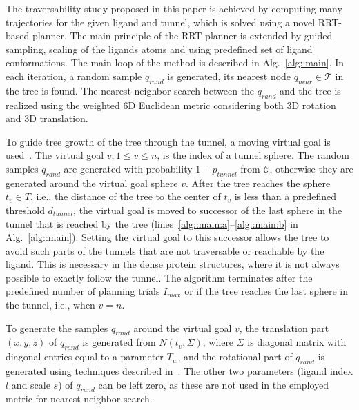 \documentclass{svmult}
\def\qrand{q_{rand}}
\def\qnear{q_{near}}
\def\T{\mathcal{T}}
\def\C{\mathcal{C}}
\def\dt{d_{tunnel}}
\def\rv{T_w}
\def\Imax{I_{max}} %
\def\gb{p_{tunnel}}
\begin{document}
The traversability study proposed in this paper is achieved by computing many trajectories for the given ligand and tunnel, which
is solved using a novel RRT-based planner.
The main principle of the RRT planner is extended by guided sampling, scaling of the ligands atoms and using predefined set of ligand
conformations.
The main loop of the method is described in Alg.~\ref{alg::main}.
In each iteration, a random sample $\qrand$ is generated, its nearest node $\qnear\in\T$ in the tree is found.
The nearest-neighbor search between the $\qrand$ and the tree is realized using the weighted 6D Euclidean metric considering
both 3D rotation and 3D translation.

To guide tree growth of the tree through the tunnel, a moving virtual goal is used~\cite{vonasek2009rrt}.
The virtual goal $v, 1\le v \le n$, is the index of a tunnel sphere.
The random samples $\qrand$ are generated with probability $1-\gb$ from $\C$, otherwise they are generated
around the virtual goal sphere $v$.
After the tree reaches the sphere $t_v \in T$, i.e., the distance of the tree to the center of $t_v$ is
less than a predefined threshold $\dt$, the virtual goal is moved to successor of the last sphere in the tunnel
that is reached by the tree (lines~\ref{alg::main:a}--\ref{alg::main:b} in Alg.~\ref{alg::main}).
Setting the virtual goal to this successor allows the tree to avoid such parts of the tunnels that are
not traversable or reachable by the ligand.
This is necessary in the dense protein structures, where it is not always possible to exactly follow the tunnel.
The algorithm terminates after the predefined number of planning trials $\Imax$ or if the tree reaches
the last sphere in the tunnel, i.e., when $v = n$.

To generate the samples $\qrand$ around the virtual goal $v$, the translation part $(x,y,z)$ of $\qrand$ is generated
from $N(t_v,\Sigma)$, where $\Sigma$ is diagonal matrix with diagonal entries equal to a parameter $\rv$, and the rotational
part of $\qrand$ is generated using techniques described in~\cite{kuffnerES}.
The other two parameters (ligand index $l$ and scale $s$) of $\qrand$ can be left zero, as these are not used in the employed
metric for nearest-neighbor search.
\end{document}
